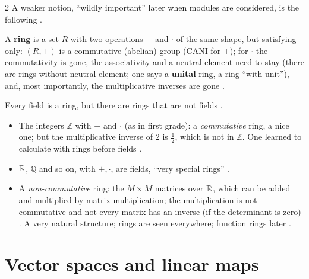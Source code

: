 \begin{paracol}{2}
A weaker notion, ``wildly important'' later when modules are considered, is the following .
\begin{definition}\label{def:te-ring}
A \textbf{ring} is a set $R$ with two operations $+$ and $\cdot$ of the same shape, but satisfying only: $(R,+)$ is a commutative (abelian) group (CANI for $+$); for $\cdot$ the commutativity is gone, the associativity and a neutral element need to stay (there are rings without neutral
element; one says a \textbf{unital} ring, a ring ``with unit''), and, most importantly, the multiplicative inverses are gone .
\end{definition}
Every field is a ring, but there are rings that are not fields .
\begin{example}\label{ex:te-rings}
\begin{itemize}
  \item The integers $\mathbb Z$ with $+$ and $\cdot$ (as in first grade): a \emph{commutative} ring, a nice one; but the multiplicative inverse of $2$ is $\tfrac12$, which is not in $\mathbb Z$. One learned to calculate with rings before fields .
  \item $\mathbb{R}$, $\mathbb Q$ and so on, with $+,\cdot$, are fields, ``very special rings'' .
  \item A \emph{non-commutative} ring: the $M\times M$ matrices over $\mathbb{R}$, which can be added and multiplied by matrix multiplication; the multiplication is not commutative and not every matrix has an inverse (if the determinant is zero)
        . A very natural structure; rings are seen everywhere; function rings later .
\end{itemize}
\end{example}

\section{Vector spaces and linear maps}\label{sec:te-vs}


\end{paracol}

